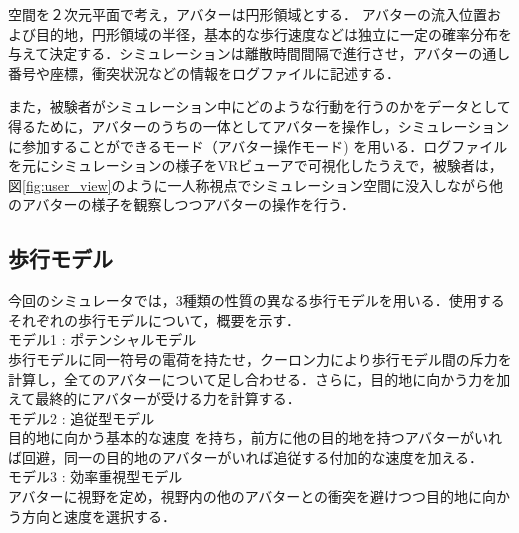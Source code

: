 \documentclass[twocolumn]{jarticle}%
\begin{document}
空間を２次元平面で考え，アバターは円形領域とする． アバターの流入位置および目的地，円形領域の半径，基本的な歩行速度などは独立に一定の確率分布を与えて決定する．シミュレーションは離散時間間隔で進行させ，アバターの通し番号や座標，衝突状況などの情報をログファイルに記述する． 

また，被験者がシミュレーション中にどのような行動を行うのかをデータとして得るために，アバターのうちの一体としてアバターを操作し，シミュレーションに参加することができるモード（アバター操作モード) を用いる．ログファイルを元にシミュレーションの様子をVRビューアで可視化したうえで，被験者は，図\ref{fig:user_view}のように一人称視点でシミュレーション空間に没入しながら他のアバターの様子を観察しつつアバターの操作を行う．

\subsection{歩行モデル}
今回のシミュレータでは，3種類の性質の異なる歩行モデルを用いる．使用するそれぞれの歩行モデルについて，概要を示す．\\

モデル1 : ポテンシャルモデル\cite{Akuzawa}\\
歩行モデルに同一符号の電荷を持たせ，クーロン力により歩行モデル間の斥力を計算し，全てのアバターについて足し合わせる．さらに，目的地に向かう力を加えて最終的にアバターが受ける力を計算する． \\

モデル2 : 追従型モデル\cite{Sasagawa}\\
目的地に向かう基本的な速度 を持ち，前方に他の目的地を持つアバターがいれば回避，同一の目的地のアバターがいれば追従する付加的な速度を加える．\\

モデル3 : 効率重視型モデル\\
アバターに視野を定め，視野内の他のアバターとの衝突を避けつつ目的地に向かう方向と速度を選択する． \\
\end{document}

